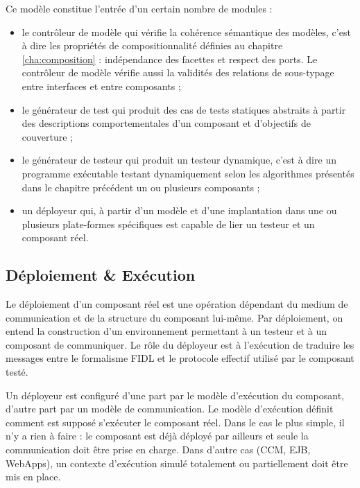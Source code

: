 Ce mod\`ele constitue l'entr\'ee d'un certain nombre de modules :
\begin{itemize}
  \item le contr\^oleur de mod\`ele qui v\'erifie la coh\'erence
  s\'emantique des mod\`eles, c'est \`a dire les propri\'et\'es
  de compositionnalit\'e d\'efinies au chapitre
  \ref{cha:composition} : ind\'ependance des facettes et respect des
  ports. Le contr\^oleur de mod\`ele v\'erifie aussi la
  validit\'es des relations de sous-typage entre interfaces et entre
  composants ;
\item le g\'en\'erateur de test qui produit des cas de tests
  statiques abstraits \`a partir des descriptions comportementales
  d'un composant et d'objectifs de couverture ;
\item le g\'en\'erateur de testeur qui produit un testeur dynamique,
  c'est \`a dire un programme ex\'ecutable testant dynamiquement
  selon les algorithmes pr\'esent\'es dans le chapitre
  pr\'ec\'edent un ou plusieurs composants ;
\item un d\'eployeur qui, \`a partir d'un mod\`ele et d'une
  implantation dans une ou plusieurs plate-formes sp\'ecifiques est
  capable de lier un testeur et  un composant r\'eel. 
\end{itemize}

\subsection{D\'eploiement \& Ex\'ecution}

Le d\'eploiement d'un composant r\'eel est une op\'eration
d\'ependant du medium de communication et de la structure du
composant lui-m\^eme. Par d\'eploiement, on
entend la construction d'un environnement permettant \`a un testeur
et \`a un composant de communiquer. Le r\^ole du d\'eployeur est
\`a l'ex\'ecution de traduire les messages entre le formalisme
\textsf{FIDL} et le protocole effectif utilis\'e par le composant
test\'e.

Un d\'eployeur est configur\'e d'une part par le mod\`ele
d'ex\'ecution du composant, d'autre part par un mod\`ele de
communication. Le mod\`ele d'ex\'ecution d\'efinit comment est
suppos\'e s'ex\'ecuter le composant r\'eel. Dans le cas le plus
simple, il n'y a rien \`a faire : le composant est d\'ej\`a
d\'eploy\'e par ailleurs et seule la communication doit \^etre
prise en charge. Dans d'autre cas (CCM, EJB, WebApps), un contexte
d'ex\'ecution simul\'e totalement ou partiellement doit \^etre mis
en place. 

